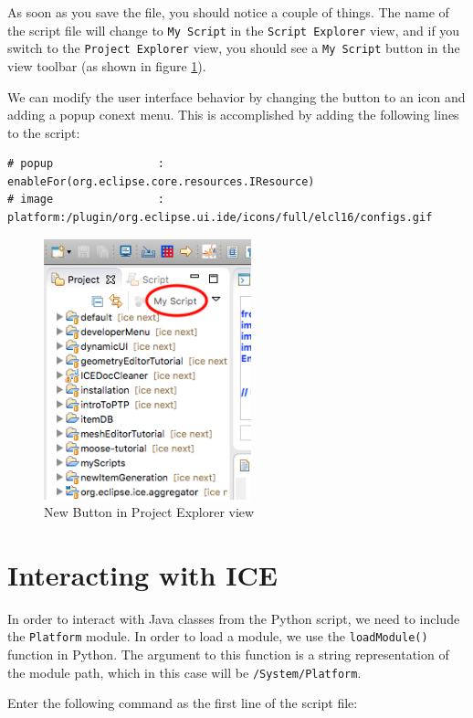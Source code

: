 As soon as you save the file, you should notice a couple of things. The name of
the script file will change to \texttt{My Script} in the \texttt{Script
Explorer} view, and if you switch to the \texttt{Project Explorer} view, you
should see a \texttt{My Script} button in the view toolbar (as shown in figure
\ref{fig:myscript}).

We can modify the user interface behavior by changing the button to an icon and
adding a popup conext menu. This is accomplished by adding the following lines
to the script:

{\small
\begin{verbatim}
# popup				   : enableFor(org.eclipse.core.resources.IResource) 
# image				   : platform:/plugin/org.eclipse.ui.ide/icons/full/elcl16/configs.gif
\end{verbatim}
}

\begin{figure}[!ht]
\centering
\includegraphics[width=6cm]{images/projexplorer}
\caption{New Button in Project Explorer view}
\label{fig:myscript}
\end{figure}

\section{Interacting with ICE}

In order to interact with Java classes from the Python script, we 
need to include the \texttt{Platform} module. In order to load a module, we use
the \texttt{loadModule()} function in Python. The argument to this function is a
string representation of the module path, which in this case will be
\texttt{/System/Platform}. 

Enter the following command as the first line of the script file:

